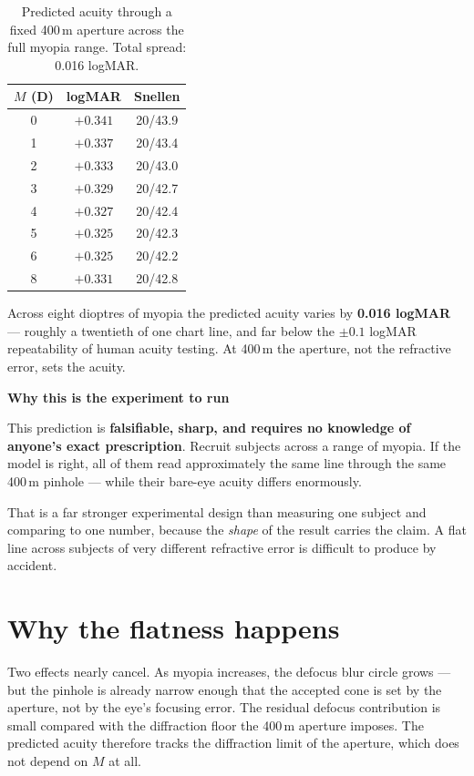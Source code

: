 \documentclass[11pt]{report}
\newenvironment{keybox}[1]%
{\par\vspace{8pt}\begin{lrbox}{\kbsave}\begin{minipage}{0.88\textwidth}%
{\bfseries\color{hbblue}#1}\par\vspace{4pt}\ignorespaces}%
{\end{minipage}\end{lrbox}%
\begin{center}\setlength{\fboxrule}{1.2pt}\setlength{\fboxsep}{8pt}%
\fcolorbox{hbblue}{boxgrey}{\usebox{\kbsave}}\end{center}\vspace{8pt}\par}
\begin{document}
\begin{table}[h!]
\centering
\begin{tabular}{ccc}
\toprule
$M$ (D) & logMAR & Snellen \\
\midrule
0 & $+0.341$ & 20/43.9 \\
1 & $+0.337$ & 20/43.4 \\
2 & $+0.333$ & 20/43.0 \\
3 & $+0.329$ & 20/42.7 \\
4 & $+0.327$ & 20/42.4 \\
5 & $+0.325$ & 20/42.3 \\
6 & $+0.325$ & 20/42.2 \\
8 & $+0.331$ & 20/42.8 \\
\bottomrule
\end{tabular}
\caption{Predicted acuity through a fixed 400\,\textmu m aperture across the full myopia range.
Total spread: 0.016 logMAR.}
\end{table}

Across eight dioptres of myopia the predicted acuity varies by \textbf{0.016 logMAR} --- roughly a
twentieth of one chart line, and far below the $\pm0.1$ logMAR repeatability of human acuity
testing. At 400\,\textmu m the aperture, not the refractive error, sets the acuity.

\begin{keybox}{Why this is the experiment to run}
This prediction is \textbf{falsifiable, sharp, and requires no knowledge of anyone's exact
prescription}. Recruit subjects across a range of myopia. If the model is right, all of them read
approximately the same line through the same 400\,\textmu m pinhole --- while their bare-eye acuity
differs enormously.

That is a far stronger experimental design than measuring one subject and comparing to one number,
because the \emph{shape} of the result carries the claim. A flat line across subjects of very
different refractive error is difficult to produce by accident.
\end{keybox}

\section{Why the flatness happens}

Two effects nearly cancel. As myopia increases, the defocus blur circle grows --- but the pinhole is
already narrow enough that the accepted cone is set by the aperture, not by the eye's focusing error.
The residual defocus contribution is small compared with the diffraction floor the 400\,\textmu m
aperture imposes. The predicted acuity therefore tracks the diffraction limit of the aperture, which
does not depend on $M$ at all.
\end{document}

